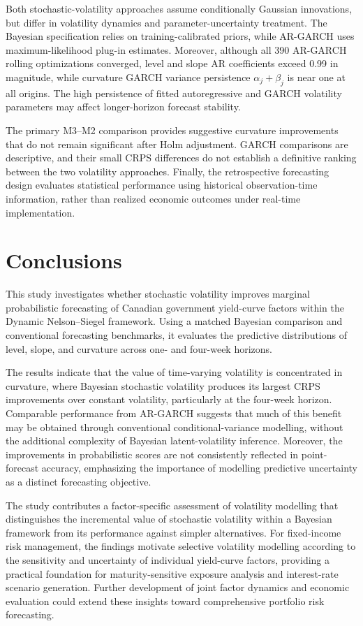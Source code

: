 \documentclass[
  12pt,
  letterpaper,
  DIV=11,
  numbers=noendperiod]{scrreprt}
\begin{document}
Both stochastic-volatility approaches assume conditionally Gaussian
innovations, but differ in volatility dynamics and parameter-uncertainty
treatment. The Bayesian specification relies on training-calibrated
priors, while AR-GARCH uses maximum-likelihood plug-in estimates.
Moreover, although all 390 AR-GARCH rolling optimizations converged,
level and slope AR coefficients exceed 0.99 in magnitude, while
curvature GARCH variance persistence \(\alpha_j+\beta_j\) is near one at
all origins. The high persistence of fitted autoregressive and GARCH
volatility parameters may affect longer-horizon forecast stability.

The primary M3--M2 comparison provides suggestive curvature improvements
that do not remain significant after Holm adjustment. GARCH comparisons
are descriptive, and their small CRPS differences do not establish a
definitive ranking between the two volatility approaches. Finally, the
retrospective forecasting design evaluates statistical performance using
historical observation-time information, rather than realized economic
outcomes under real-time implementation.

\chapter{Conclusions}\label{sec-conclusions}

This study investigates whether stochastic volatility improves marginal
probabilistic forecasting of Canadian government yield-curve factors
within the Dynamic Nelson--Siegel framework. Using a matched Bayesian
comparison and conventional forecasting benchmarks, it evaluates the
predictive distributions of level, slope, and curvature across one- and
four-week horizons.

The results indicate that the value of time-varying volatility is
concentrated in curvature, where Bayesian stochastic volatility produces
its largest CRPS improvements over constant volatility, particularly at
the four-week horizon. Comparable performance from AR-GARCH suggests
that much of this benefit may be obtained through conventional
conditional-variance modelling, without the additional complexity of
Bayesian latent-volatility inference. Moreover, the improvements in
probabilistic scores are not consistently reflected in point-forecast
accuracy, emphasizing the importance of modelling predictive uncertainty
as a distinct forecasting objective.

The study contributes a factor-specific assessment of volatility
modelling that distinguishes the incremental value of stochastic
volatility within a Bayesian framework from its performance against
simpler alternatives. For fixed-income risk management, the findings
motivate selective volatility modelling according to the sensitivity and
uncertainty of individual yield-curve factors, providing a practical
foundation for maturity-sensitive exposure analysis and interest-rate
scenario generation. Further development of joint factor dynamics and
economic evaluation could extend these insights toward comprehensive
portfolio risk forecasting.
\end{document}
